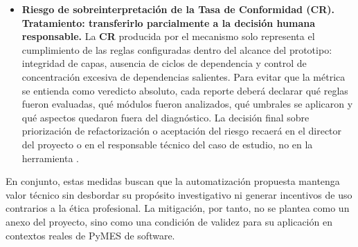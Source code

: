 \begin{itemize}
    \item \textbf{Riesgo de sobreinterpretación de la Tasa de Conformidad (CR). Tratamiento: transferirlo parcialmente a la decisión humana responsable.} La \textbf{CR} producida por el mecanismo solo representa el cumplimiento de las reglas configuradas dentro del alcance del prototipo: integridad de capas, ausencia de ciclos de dependencia y control de concentración excesiva de dependencias salientes. Para evitar que la métrica se entienda como veredicto absoluto, cada reporte deberá declarar qué reglas fueron evaluadas, qué módulos fueron analizados, qué umbrales se aplicaron y qué aspectos quedaron fuera del diagnóstico. La decisión final sobre priorización de refactorización o aceptación del riesgo recaerá en el director del proyecto o en el responsable técnico del caso de estudio, no en la herramienta \parencite{Klein2022, LAIG2025}.
\end{itemize}

En conjunto, estas medidas buscan que la automatización propuesta mantenga valor
técnico sin desbordar su propósito investigativo ni generar incentivos de uso
contrarios a la ética profesional. La mitigación, por tanto, no se plantea como
un anexo del proyecto, sino como una condición de validez para su aplicación en
contextos reales de PyMES de software.